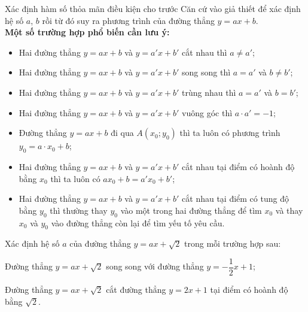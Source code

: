 \begin{dang}{Xác định hàm số thỏa mãn điều kiện cho trước}
Căn cứ vào giả thiết để xác định hệ số $a$, $b$ rồi từ đó suy ra phương trình của đường thẳng $y=ax+b$.\\
\textbf{Một số trường hợp phổ biến cần lưu ý:}
\begin{itemize}
	\item Hai đường thẳng $y=ax+b$ và $y=a'x+b'$ cắt nhau thì $a\neq a'$;
	\item Hai đường thẳng $y=ax+b$ và $y=a'x+b'$ song song thì $a=a'$ và $b\neq b'$;
	\item Hai đường thẳng $y=ax+b$ và $y=a'x+b'$ trùng nhau thì $a=a'$ và $b=b'$;
	\item Hai đường thẳng $y=ax+b$ và $y=a'x+b'$ vuông góc thì $a\cdot a'=-1$;
	\item Đường thẳng $y=ax+b$ đi qua $A(x_0;y_0)$ thì ta luôn có phương trình $y_0=a\cdot x_0+b$;
	\item Hai đường thẳng $y=ax+b$ và $y=a'x+b'$ cắt nhau tại điểm có hoành độ bằng $x_0$ thì ta luôn có $ax_0+b=a'x_0+b'$;
	\item Hai đường thẳng $y=ax+b$ và $y=a'x+b'$ cắt nhau tại điểm có tung độ bằng $y_0$ thì thường thay $y_0$ vào một trong hai đường thẳng để tìm $x_0$ và thay $x_0$ và $y_0$ vào đường thẳng còn lại để tìm yếu tố yêu cầu.
\end{itemize}	
\end{dang}
\begin{vd}
	Xác định hệ số $a$ của đường thẳng $y=ax+\sqrt{2}$ trong mỗi trường hợp sau:
	\begin{enumEX}{1}
		\item Đường thẳng $y=ax+\sqrt{2}$ song song với đường thẳng $y=-\dfrac{1}{2}x+1$;
		\item Đường thẳng $y=ax+\sqrt{2}$ cắt đường thẳng $y=2x+1$ tại điểm có hoành độ bằng $\sqrt{2}$.
	\end{enumEX}
\end{vd}
